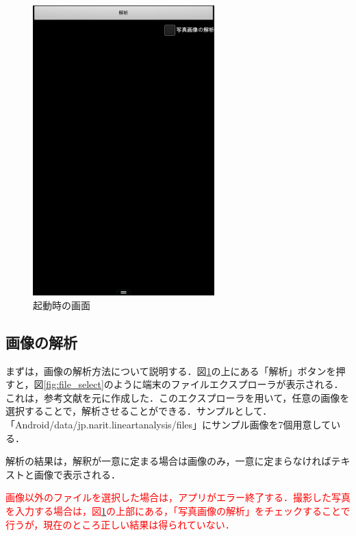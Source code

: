 \documentclass{jarticle}
\begin{document}
\begin{figure}[H]
\begin{center}
\includegraphics[width=70mm]{../play_store/photo.png}
\caption{起動時の画面}
\label{fig:photo}
\end{center}
\end{figure}


\subsection{画像の解析}
\label{sec:how_to_use_image_analysis}
まずは，画像の解析方法について説明する．図\ref{fig:photo}の上にある「解析」ボタンを押すと，図\ref{fig:file_select}のように端末のファイルエクスプローラが表示される．これは，参考文献\cite{ref:file_explorer}を元に作成した．このエクスプローラを用いて，任意の画像を選択することで，解析させることができる．サンプルとして．「Android/data/jp.narit.lineartanalysis/files」にサンプル画像を7個用意している．

解析の結果は，解釈が一意に定まる場合は画像のみ，一意に定まらなければテキストと画像で表示される．

\textcolor{red}{画像以外のファイルを選択した場合は，アプリがエラー終了する．撮影した写真を入力する場合は，図\ref{fig:photo}の上部にある，「写真画像の解析」をチェックすることで行うが，現在のところ正しい結果は得られていない．}
\end{document}
